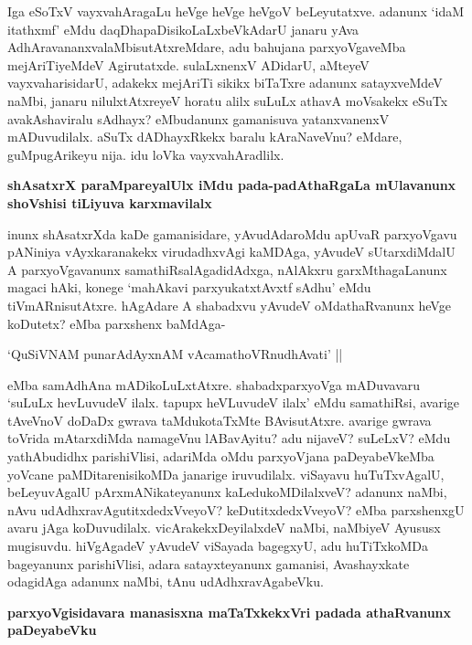 Iga eSoTxV vayxvahAragaLu heVge heVge heVgoV beLeyutatxve. adanunx `idaM itathxmf' eMdu daqDhapaDisikoLaLxbeVkAdarU janaru yAva AdhAravananxvalaMbisutAtxreMdare, adu bahujana parxyoVgaveMba mejAriTiyeMdeV Agirutatxde. sulaLxnenxV ADidarU, aMteyeV vayxvaharisidarU, adakekx mejAriTi sikikx biTaTxre adanunx satayxveMdeV naMbi, janaru nilulxtAtxreyeV horatu alilx suLuLx athavA moVsakekx eSuTx avakAshaviralu sAdhayx? eMbudanunx gamanisuva yatanxvanenxV mADuvudilalx. aSuTx dADhayxRkekx baralu kAraNaveVnu? eMdare, guMpugArikeyu nija. idu loVka vayxvahAradlilx.

{\bf shAsatxrX paraMpareyalUlx iMdu pada-padAthaRgaLa mUlavanunx shoVshisi tiLiyuva karxmavilalx}

inunx shAsatxrXda kaDe gamanisidare, yAvudAdaroMdu apUvaR parxyoVgavu pANiniya vAyxkaranakekx virudadhxvAgi kaMDAga, yAvudeV sUtarxdiMdalU A parxyoVgavanunx samathiRsalAgadidAdxga, nAlAkxru garxMthagaLanunx magaci hAki, konege `mahAkavi parxyukatxtAvxtf sAdhu' eMdu tiVmARnisutAtxre. hAgAdare A shabadxvu yAvudeV oMdathaRvanunx heVge koDutetx? eMba parxshenx baMdAga-

\begin{shloka}
`QuSiVNAM punarAdAyxnAM vAcamathoVRnudhAvati' ||
\end{shloka}

eMba samAdhAna mADikoLuLxtAtxre. shabadxparxyoVga mADuvavaru `suLuLx hevLuvudeV ilalx. tapupx heVLuvudeV ilalx' eMdu samathiRsi, avarige tAveVnoV doDaDx gwrava taMdukotaTxMte BAvisutAtxre. avarige gwrava toVrida mAtarxdiMda namageVnu lABavAyitu? adu nijaveV? suLeLxV? eMdu yathAbudidhx parishiVlisi, adariMda oMdu parxyoVjana paDeyabeVkeMba yoVcane paMDitarenisikoMDa janarige iruvudilalx. viSayavu huTuTxvAgalU, beLeyuvAgalU pArxmANikateyanunx kaLedukoMDilalxveV? adanunx naMbi, nAvu udAdhxravAgutitxdedxVveyoV? keDutitxdedxVveyoV? eMba parxshenxgU avaru jAga koDuvudilalx. vicArakekxDeyilalxdeV naMbi, naMbiyeV Ayususx mugisuvdu. hiVgAgadeV yAvudeV viSayada bagegxyU, adu huTiTxkoMDa bageyanunx parishiVlisi, adara satayxteyanunx gamanisi, Avashayxkate odagidAga adanunx naMbi, tAnu udAdhxravAgabeVku.

{\bf parxyoVgisidavara manasisxna maTaTxkekxVri padada athaRvanunx paDeyabeVku}

